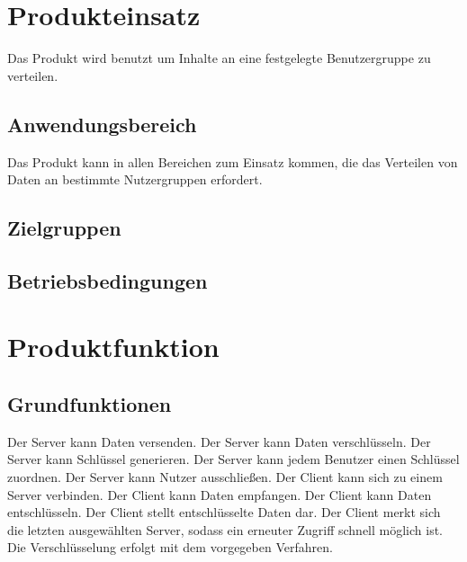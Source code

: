 \documentclass[a4paper,10pt]{article}
\begin{document}
\section{Produkteinsatz}
Das Produkt wird benutzt um Inhalte an eine festgelegte Benutzergruppe zu verteilen.
\subsection{Anwendungsbereich}
Das Produkt kann in allen Bereichen zum Einsatz kommen, die das Verteilen von Daten an
bestimmte Nutzergruppen erfordert.
\subsection{Zielgruppen}

\subsection{Betriebsbedingungen}

\section{Produktfunktion}

\subsection{Grundfunktionen}

\begin{usecase}
 {Der Server kann Daten versenden.}
 {Der Server kann Daten verschlüsseln.}
 {Der Server kann Schlüssel generieren.}
 {Der Server kann jedem Benutzer einen Schlüssel zuordnen.}
 {Der Server kann Nutzer ausschließen.}
 {Der Client kann sich zu einem Server verbinden.}
 {Der Client kann Daten empfangen.}
 {Der Client kann Daten entschlüsseln.}
 {Der Client stellt entschlüsselte Daten dar.}
 {Der Client merkt sich die letzten ausgewählten Server,
                  sodass ein erneuter Zugriff schnell möglich ist.}
 {Die Verschlüsselung erfolgt mit dem vorgegeben Verfahren.}
\end{usecase}
\end{document}
